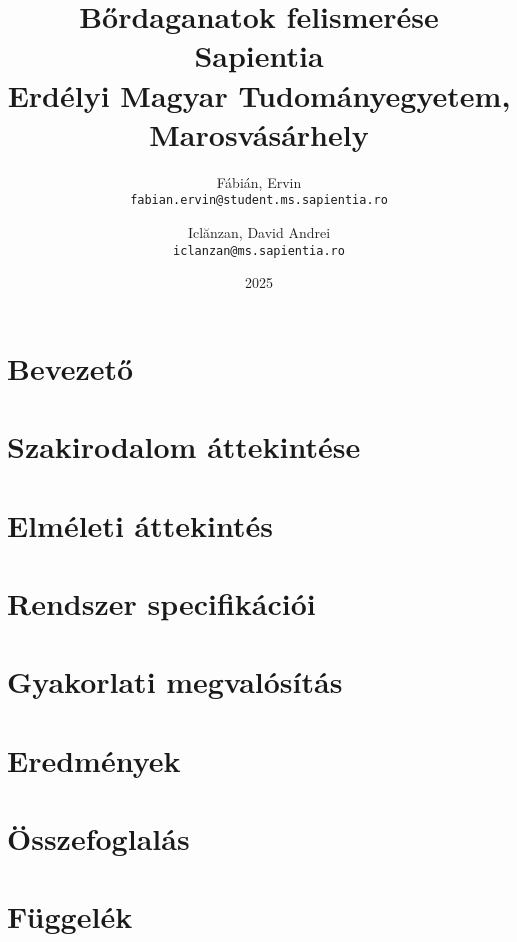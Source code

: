 \documentclass[12pt, twosides]{report}
\title{
	{Bőrdaganatok felismerése}\\
	{\large Sapientia\\
	Erdélyi Magyar Tudományegyetem, Marosvásárhely}
}
\author{
	Fábián, Ervin\\
	\texttt{fabian.ervin@student.ms.sapientia.ro}
	\and
	Iclănzan, David Andrei\\
	\texttt{iclanzan@ms.sapientia.ro}	
}
\date{2025}
\begin{document}
%

%

%

%

%


\tableofcontents

\listoffigures

\chapter{Bevezető}


\chapter{Szakirodalom áttekintése}


\chapter{Elméleti áttekintés}


\chapter{Rendszer specifikációi}


\chapter{Gyakorlati megvalósítás} \label{chpt:implementation}


\chapter{Eredmények}


\chapter{Összefoglalás}





\appendix
\chapter{Függelék}

\end{document}
